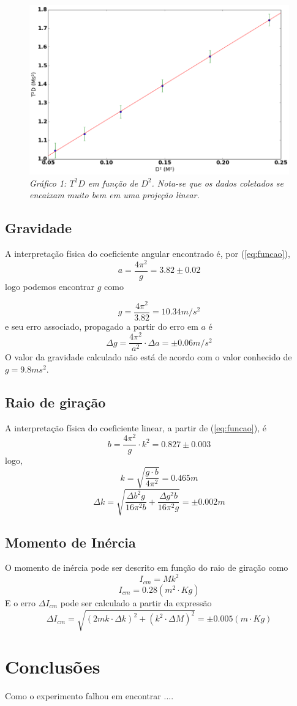 \documentclass[12pt,a4paper]{article}
\begin{document}
\begin{figure}[!hbtbp]

\includegraphics[scale=0.55]{index.png} 
\emph{Gráfico 1: $T^2D$ em função de $D^2$. Nota-se que os dados coletados se encaixam muito bem em uma projeção linear.}

\label{fig:Grafico}
\end{figure}
\subsection{Gravidade}
A interpretação física do coeficiente angular encontrado é, por (\ref{eq:funcao}),
 $$ a = \frac{4\pi^2}{g} = 3.82 \pm 0.02$$
  logo podemos encontrar $g$ como 

  $$ g = \frac{4\pi^2}{3.82} = 10.34 m/s^2 $$ 
  e seu erro associado, propagado a partir do erro em $a$ é
  $$ \Delta g = \frac{4\pi^2}{a^2} \cdot \Delta a = \pm 0.06 m/s^2 $$
  O valor da gravidade calculado não está de acordo com o valor conhecido de $g =  9.8ms^2$.
  
\subsection{Raio de giração}

A interpretação física do coeficiente linear, a partir de (\ref{eq:funcao}), é 
$$ b = \frac{4\pi^2}{g} \cdot k^2 = 0.827 \pm 0.003 $$
logo, 
$$ k = \sqrt{\frac{g \cdot b}{4\pi^2}} = 0.465 m $$
$$ \Delta k =
\sqrt{\frac{\Delta b^{2} g}{16 \pi^{2} b} + \frac{\Delta g^{2} b}{16 \pi^{2} g}} 
 =  \pm 0.002  m$$

\subsection{Momento de Inércia}
O momento de inércia pode ser descrito em função do raio de giração como 
$$ I_{cm}  = Mk^2 $$
$$ I_{cm}  = 0.28 (m^2 \cdot Kg)$$
E o erro $ \Delta I_{cm}$ pode ser calculado a partir da expressão 
$$\Delta I_{cm}  =\sqrt{(2mk \cdot \Delta k)^2 + (k^2 \cdot \Delta M)^2} = \pm 0.005 (m \cdot Kg) $$

\section{Conclusões}
Como o experimento falhou em encontrar ....
\end{document}

